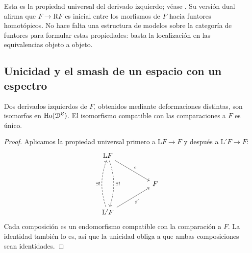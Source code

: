 Esta es la propiedad universal del derivado izquierdo; véase \cite[Proposición~3.5.1.2]{malkiewich}. Su versión dual afirma que $F\to\mathrm RF$ es inicial entre los morfismos de $F$ hacia funtores homotópicos. No hace falta una estructura de modelos sobre la categoría de funtores para formular estas propiedades: basta la localización en las equivalencias objeto a objeto.

\subsection{Unicidad y el smash de un espacio con un espectro}

\begin{coro}\label{coro:c16-unicidad-derivados}
Dos derivados izquierdos de $F$, obtenidos mediante deformaciones distintas, son isomorfos en $\operatorname{Ho}(\mathcal D^{\mathcal C})$. El isomorfismo compatible con las comparaciones a $F$ es único.
\end{coro}

\begin{proof}
Aplicamos la propiedad universal primero a $\mathrm LF\to F$ y después a $\mathrm L'F\to F$:
\[
\begin{tikzcd}[column sep=huge,row sep=large]
\mathrm LF\arrow[dr,"\varepsilon"]\arrow[dd,dashed,bend left=18,"\exists!"]&\\
&F\\
\mathrm L'F\arrow[ur,"\varepsilon'"']\arrow[uu,dashed,bend left=18,"\exists!"]&
\end{tikzcd}
\]
Cada composición es un endomorfismo compatible con la comparación a $F$. La identidad también lo es, así que la unicidad obliga a que ambas composiciones sean identidades.
\end{proof}

